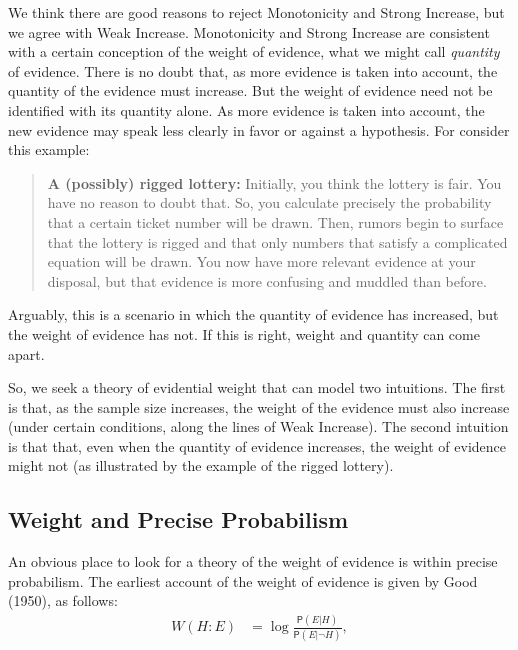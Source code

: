 \documentclass[
  10pt,
  dvipsnames,enabledeprecatedfontcommands]{scrartcl}
\newcommand{\pr}[1]{\mathsf{P}(#1)}
\begin{document}
\vspace{1mm}

\noindent We think there are good reasons to reject Monotonicity and
Strong Increase, but we agree with Weak Increase. Monotonicity and
Strong Increase are consistent with a certain conception of the weight
of evidence, what we might call \emph{quantity} of evidence. There is no
doubt that, as more evidence is taken into account, the quantity of the
evidence must increase. But the weight of evidence need not be
identified with its quantity alone. As more evidence is taken into
account, the new evidence may speak less clearly in favor or against a
hypothesis. For consider this example:

\begin{quote}
\textbf{A (possibly) rigged lottery:} Initially, you think the lottery  is  fair. You have no reason to doubt that. So, you calculate precisely the probability that a certain ticket number will be drawn. Then, rumors begin to surface that the lottery is rigged and that only numbers that satisfy a complicated equation will be drawn. You now have more relevant evidence at your disposal, but that evidence is more confusing and muddled than before. 
\end{quote}

\noindent Arguably, this is a scenario in which the quantity of evidence
has increased, but the weight of evidence has not. If this is right,
weight and quantity can come apart.

So, we seek a theory of evidential weight that can model two intuitions.
The first is that, as the sample size increases, the weight of the
evidence must also increase (under certain conditions, along the lines
of Weak Increase). The second intuition is that that, even when the
quantity of evidence increases, the weight of evidence might not (as
illustrated by the example of the rigged lottery).

\hypertarget{weight-and-precise-probabilism}{%
\subsection{Weight and Precise
Probabilism}\label{weight-and-precise-probabilism}}

An obvious place to look for a theory of the weight of evidence is
within precise probabilism. The earliest account of the weight of
evidence is given by Good (1950), as follows: \begin{align*}
W(H:E) & = \log \frac{\pr{E \vert H}}{\pr{E\vert \neg H}},
\end{align*}
\end{document}
